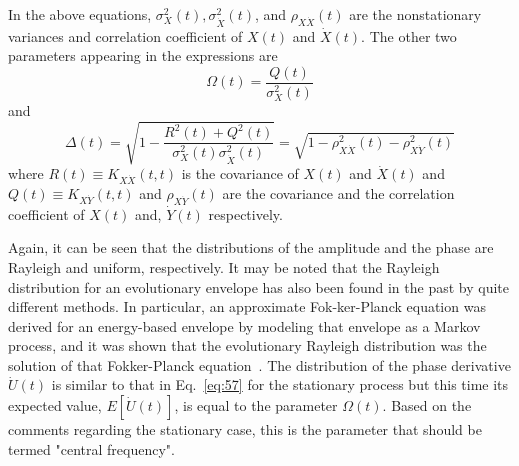 \documentclass[12pt]{article}
\begin{document}
In the above equations, $\sigma_{X}^{2}(t), \sigma_{\dot{X}}^{2}(t)$, and $\rho_{X \dot{X}}(t)$ are the nonstationary variances and correlation coefficient of $X(t)$ and $\dot{X}(t)$. The other two parameters appearing in the expressions are
\begin{equation}
\Omega(t)=\frac{Q(t)}{\sigma_{X}^{2}(t)}
\label{eq:63}
\end{equation}
and
\begin{equation}
\Delta(t)=\sqrt{1-\frac{R^{2}(t)+Q^{2}(t)}{\sigma_{X}^{2}(t) \sigma_{\dot{X}}^{2}(t)}}=\sqrt{1-\rho_{X \dot{X}}^{2}(t)-\rho_{X \dot{Y}}^{2}(t)}
\label{eq:64}
\end{equation}
where $R(t) \equiv K_{X \dot{X}}(t, t)$ is the covariance of $X(t)$ and $\dot{X}(t)$ and $Q(t) \equiv K_{X \dot{Y}}(t, t)$ and $\rho_{X \dot{Y}}(t)$ are the covariance and the correlation coefficient of $X(t)$ and, $\dot{Y}(t)$ respectively.

Again, it can be seen that the distributions of the amplitude and the phase are Rayleigh and uniform, respectively. It may be noted that the Rayleigh distribution for an evolutionary envelope has also been found in the past by quite different methods. In particular, an approximate Fok-ker-Planck equation was derived for an energy-based envelope by modeling that envelope as a Markov process, and it was shown that the evolutionary Rayleigh distribution was the solution of that Fokker-Planck equation~\cite{SpanosLutes1980,SolomosSpanos1982,SpanosSolomos1983}. The distribution of the phase derivative $\dot{U}(t)$ is similar to that in Eq.~\eqref{eq:57} for the stationary process but this time its expected value, $E[\dot{U}(t)]$, is equal to the parameter $\Omega(t)$. Based on the comments regarding the stationary case, this is the parameter that should be termed "central frequency".
\end{document}
